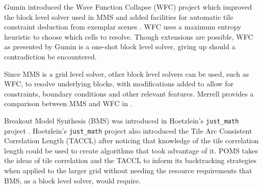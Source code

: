 Gumin introduced the Wave Function Collapse (WFC) project which improved the block level solver used in MMS
and added facilities for automatic tile constraint deduction from exemplar scenes \cite{Gumin_2016}.
WFC uses a maximum entropy heuristic to choose which cells to resolve.
Though extensions are possible, WFC as presented by Gumin is a one-shot block level solver, giving up should a contradiction be encountered.

Since MMS is a grid level solver, other block level solvers can be used, such as WFC, to resolve underlying blocks,
with modifications added to allow for constraints, boundary conditions and other relevant features.
Merrell provides a comparison between MMS and WFC in \cite{Merrell_comparison_2021}.

Breakout Model Synthesis (BMS) was introduced in Hoetzlein's \texttt{just\_math} project \cite{Hoetzlein_2023}.
Hoetzlein's \texttt{just\_math} project also introduced
the Tile Arc Consistent Correlation Length (TACCL) after noticing that knowledge of the tile correlation length could be
used to create algorithms that took advantage of it.
POMS takes the ideas of tile correlation and the TACCL to inform its backtracking strategies when applied to the larger grid
without needing the resource requirements that BMS, as a block level solver, would require.



